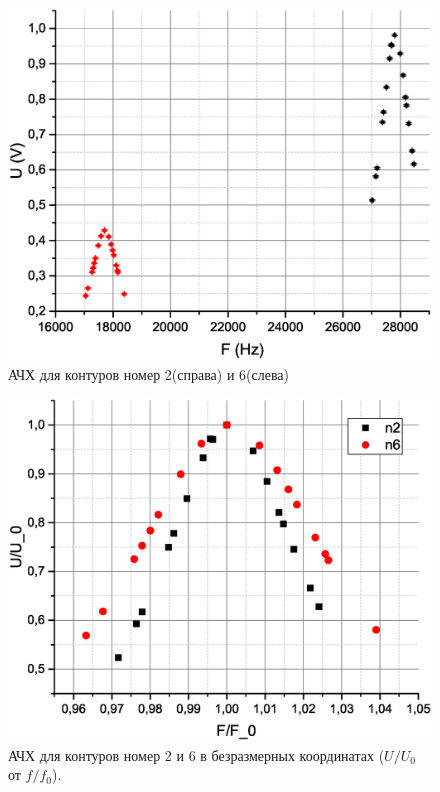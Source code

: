 \documentclass[a4paper,12pt]{article}
\begin{document}
\begin{figure}[ht]
\centering
\includegraphics[width=150mm]{graph12.eps}
\caption{АЧХ для контуров номер 2(справа) и 6(слева)}\label{achh1}
\end{figure}

\begin{figure}[ht]
\centering
\includegraphics[width=150mm]{graph13.eps}
\caption{АЧХ для контуров номер 2 и 6 в безразмерных координатах ($U/U_0$ от $f/f_0$). }\label{achh2}
\end{figure}
\end{document}
